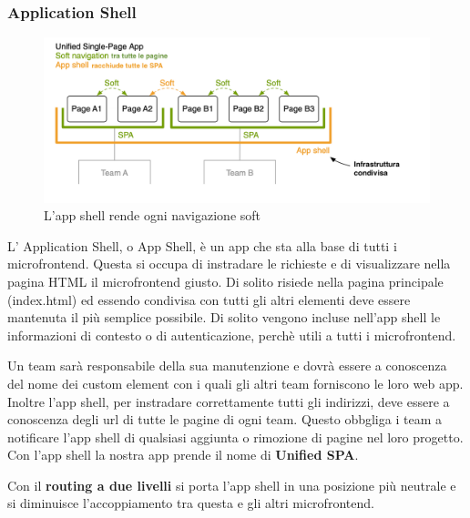 \subsubsection{Application Shell}
\begin{figure}[H]
    \centering
    \includegraphics[width=148mm]{img/appshell}
    \caption{L'app shell rende ogni navigazione soft}
  \end{figure}
L' Application Shell, o App Shell, è un app che sta alla base di tutti i microfrontend. Questa si occupa di instradare le
richieste e di visualizzare nella pagina HTML il microfrontend giusto. Di solito risiede nella pagina principale (index.html) ed essendo
condivisa con tutti gli altri elementi deve essere mantenuta il più semplice possibile.
Di solito vengono incluse nell'app shell le informazioni di contesto o di autenticazione, perchè utili a tutti i microfrontend.

Un team sarà responsabile della sua manutenzione e dovrà essere a conoscenza del nome dei custom element con i quali gli altri team forniscono
le loro web app.
Inoltre l'app shell, per instradare correttamente tutti gli indirizzi, deve essere a conoscenza degli url di tutte le pagine di ogni team.
Questo obbgliga i team a notificare l'app shell di qualsiasi aggiunta o rimozione di pagine nel loro progetto.
Con l'app shell la nostra app prende il nome di \textbf{Unified SPA}.

Con il \textbf{routing a due livelli} si porta l'app shell in una posizione più neutrale e si diminuisce l'accoppiamento tra questa e gli altri microfrontend.
